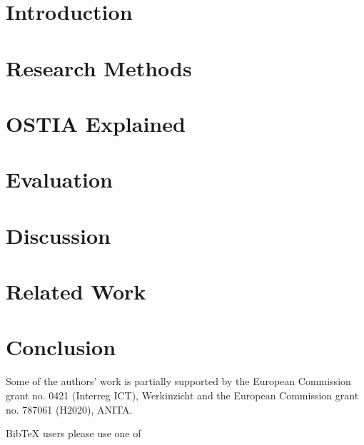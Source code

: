 \documentclass[smallextended]{svjour3}       %
\begin{document}
\section{Introduction}
\label{intro}


\section{Research Methods}

\label{ra}


\section{OSTIA Explained}
\label{rs}



\section{Evaluation}
\label{eval}


\section{Discussion}
\label{disc}


\section{Related Work}
\label{rw}


\section{Conclusion}

\label{conc}






\begin{acknowledgements}
Some of the authors' work is partially supported by the European Commission grant no. 0421 (Interreg ICT), Werkinzicht and the European Commission grant no. 787061 (H2020), ANITA.
\end{acknowledgements}

 BibTeX users please use one of

\end{document}
